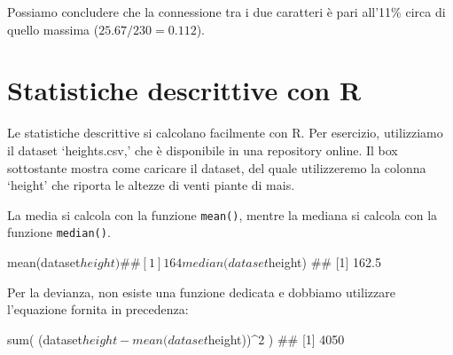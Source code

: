 \documentclass[a4paper,12pt,oneside]{book}
\newenvironment{Shaded}{\begin{snugshade}}{\end{snugshade}}
\newcommand{\DecValTok}[1]{#1}
\newcommand{\SpecialCharTok}[1]{#1}
\newcommand{\StringTok}[1]{#1}
\newcommand{\DocumentationTok}[1]{#1}
\newcommand{\OtherTok}[1]{#1}
\newcommand{\FunctionTok}[1]{#1}
\newcommand{\AttributeTok}[1]{#1}
\newcommand{\NormalTok}[1]{#1}
\begin{document}
Possiamo concludere che la connessione tra i due caratteri è pari all'11\% circa di quello massima (\(25.67/230 = 0.112\)).

\hypertarget{statistiche-descrittive-con-r}{%
\section{Statistiche descrittive con R}\label{statistiche-descrittive-con-r}}

Le statistiche descrittive si calcolano facilmente con R. Per esercizio, utilizziamo il dataset `heights.csv,' che è disponibile in una repository online. Il box sottostante mostra come caricare il dataset, del quale utilizzeremo la colonna `height' che riporta le altezze di venti piante di mais.

\begin{Shaded}
\end{Shaded}

La media si calcola con la funzione \texttt{mean()}, mentre la mediana si calcola con la funzione \texttt{median()}.

\begin{Shaded}
\begin{Highlighting}[]
\FunctionTok{mean}\NormalTok{(dataset}\SpecialCharTok{$}\NormalTok{height)}
\DocumentationTok{\#\# [1] 164}
\FunctionTok{median}\NormalTok{(dataset}\SpecialCharTok{$}\NormalTok{height)}
\DocumentationTok{\#\# [1] 162.5}
\end{Highlighting}
\end{Shaded}

Per la devianza, non esiste una funzione dedicata e dobbiamo utilizzare l'equazione fornita in precedenza:

\begin{Shaded}
\begin{Highlighting}[]
\FunctionTok{sum}\NormalTok{( (dataset}\SpecialCharTok{$}\NormalTok{height }\SpecialCharTok{{-}} \FunctionTok{mean}\NormalTok{(dataset}\SpecialCharTok{$}\NormalTok{height))}\SpecialCharTok{\^{}}\DecValTok{2}\NormalTok{ )}
\DocumentationTok{\#\# [1] 4050}
\end{Highlighting}
\end{Shaded}
\end{document}
